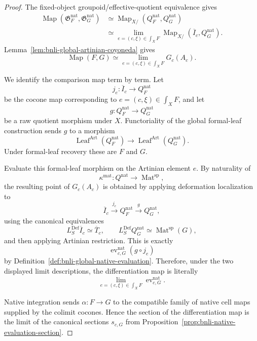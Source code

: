 \begin{proof}
The fixed-object groupoid/effective-quotient equivalence gives
\[
\begin{aligned}
    \operatorname{Map}
    (\mathfrak G_F^{\mathrm{nat}},\mathfrak G_G^{\mathrm{nat}})
    &\simeq
    \operatorname{Map}_{X/}(Q_F^{\mathrm{nat}},Q_G^{\mathrm{nat}})\\
    &\simeq
    \operatorname*{lim}_{e=(c,\xi)\in\int_XF}
    \operatorname{Map}_{X/}(\overline I_c,Q_G^{\mathrm{nat}}).
\end{aligned}
\]
Lemma~\ref{lem:bnli-global-artinian-coyoneda} gives
\[
    \operatorname{Map}(F,G)
    \simeq
    \operatorname*{lim}_{e=(c,\xi)\in\int_XF}G_c(A_c).
\]

We identify the comparison map term by term.  Let
\[
    j_e:\overline I_c\longrightarrow Q_F^{\mathrm{nat}}
\]
be the cocone map corresponding to
$e=(c,\xi)\in\int_XF$, and let
\[
    g:Q_F^{\mathrm{nat}}\longrightarrow Q_G^{\mathrm{nat}}
\]
be a raw quotient morphism under $X$.  Functoriality of the global formal-leaf
construction sends $g$ to a morphism
\[
    \operatorname{Leaf}^{\mathrm{Art}}
    (Q_F^{\mathrm{nat}})
    \longrightarrow
    \operatorname{Leaf}^{\mathrm{Art}}
    (Q_G^{\mathrm{nat}}).
\]
Under formal-leaf recovery these are $F$ and $G$.

Evaluate this formal-leaf morphism on the Artinian element $e$.  By
naturality of
\[
    \kappa^{\mathrm{mat}}:
    Q^{\mathrm{nat}}
    \longrightarrow
    \operatorname{Mat}^{\mathrm{sp}},
\]
the resulting point of $G_c(A_c)$ is obtained by applying deformation
localization to
\[
    \overline I_c
    \xrightarrow{j_e}
    Q_F^{\mathrm{nat}}
    \xrightarrow{g}
    Q_G^{\mathrm{nat}},
\]
using the canonical equivalences
\[
    L_S^{\mathrm{Def}}\overline I_c
    \simeq
    \overline T_c,
    \qquad
    L_S^{\mathrm{Def}}Q_G^{\mathrm{nat}}
    \simeq
    \operatorname{Mat}^{\mathrm{sp}}(G),
\]
and then applying Artinian restriction.  This is exactly
\[
    \operatorname{ev}^{\mathrm{nat}}_{c,G}
    \left(
      g\circ j_e
    \right)
\]
by Definition~\ref{def:bnli-global-native-evaluation}.  Therefore, under the
two displayed limit descriptions, the differentiation map is literally
\[
\boxed{
    \operatorname*{lim}_{e=(c,\xi)\in\int_XF}
    \operatorname{ev}^{\mathrm{nat}}_{c,G}.}
\]

Native integration sends $\alpha:F\to G$ to the compatible family of native
cell maps supplied by the colimit cocones.  Hence the section of the
differentiation map is the limit of the canonical sections
$s_{c,G}$ from
Proposition~\ref{prop:bnli-native-evaluation-section}.


\end{proof}
